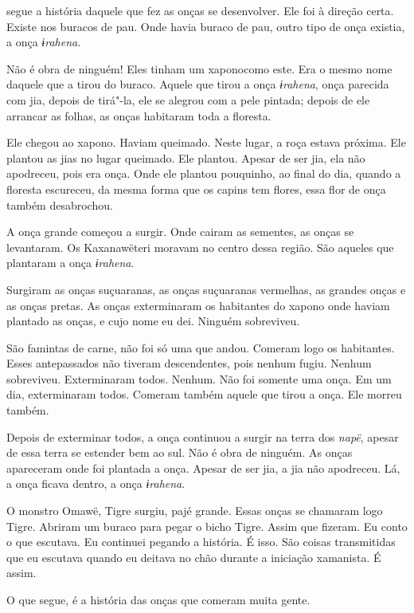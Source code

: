  

 segue a história daquele que fez as onças se desenvolver.
Ele foi à direção certa. Existe nos buracos de pau. Onde havia buraco de
pau, outro tipo de onça existia, a onça \emph{ɨrahena}. 

Não é obra de ninguém! Eles tinham um xaponocomo este. Era o mesmo nome
daquele que a tirou do buraco. Aquele que tirou a onça \emph{ɨrahena},
onça parecida com jia, depois de tirá"-la, ele se alegrou com a pele
pintada; depois de ele arrancar as folhas, as onças habitaram toda a
floresta. 

Ele chegou ao xapono. Haviam queimado. Neste lugar, a roça estava
próxima. Ele plantou as jias no lugar queimado. Ele plantou. Apesar de
ser jia, ela não apodreceu, pois era onça. Onde ele plantou pouquinho,
ao final do dia, quando a floresta escureceu, da mesma forma que os
capins tem flores, essa flor de onça também desabrochou. 

A onça grande começou a surgir. Onde cairam as sementes, as onças se
levantaram. Os Kaxanawëteri moravam no centro dessa região. São aqueles
que plantaram a onça \emph{ɨrahena}. 

Surgiram as onças suçuaranas, as onças suçuaranas vermelhas, as grandes
onças e as onças pretas. As onças exterminaram os habitantes do xapono
onde haviam plantado as onças, e cujo nome eu dei. Ninguém sobreviveu. 

São famintas de carne, não foi só uma que andou. Comeram logo os
habitantes. Esses antepassados não tiveram descendentes, pois nenhum
fugiu. Nenhum sobreviveu. Exterminaram todos. Nenhum. Não foi somente
uma onça. Em um dia, exterminaram todos. Comeram também aquele que tirou
a onça. Ele morreu também. 

Depois de exterminar todos, a onça continuou a surgir na terra
dos \emph{napë}, apesar de essa terra se estender bem ao sul. Não é obra
de ninguém. As onças apareceram onde foi plantada a onça. Apesar de ser
jia, a jia não apodreceu. Lá, a onça ficava dentro, a
onça \emph{ɨrahena}. 

O monstro Omawë, Tigre surgiu, pajé grande. Essas onças se chamaram logo
Tigre. Abriram um buraco para pegar o bicho Tigre. Assim que fizeram. Eu
conto o que escutava. Eu continuei pegando a história. É isso. São
coisas transmitidas que eu escutava quando eu deitava no chão durante a
iniciação xamanista. É assim. 

O que segue, é a história das onças que comeram muita gente. 

